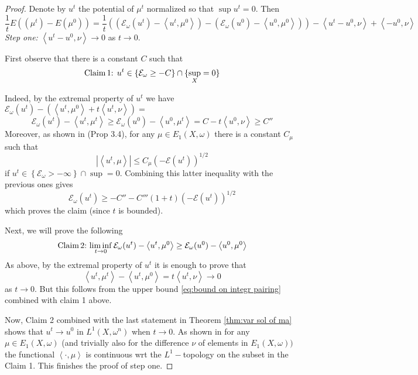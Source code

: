 \documentclass[11pt,oneside,english]{amsart}
\numberwithin{equation}{section}
\numberwithin{figure}{section}
\theoremstyle{plain}
\theoremstyle{plain}
\theoremstyle{plain}
\theoremstyle{plain}
\theoremstyle{remark}
\theoremstyle{definition}
\begin{document}
\begin{proof}
Denote by $u^{t}$ the potential of $\mu^{t}$ normalized so that
$\sup u^{t}=0.$ Then 
\begin{equation}
\frac{1}{t}E\left((\mu^{t})-E(\mu^{0})\right)=\frac{1}{t}\left((\mathcal{E}_{\omega}(u^{t})-\left\langle u^{t},\mu^{0}\right\rangle )-(\mathcal{E}_{\omega}(u^{0})-\left\langle u^{0},\mu^{0}\right\rangle )\right)-\left\langle u^{t}-u^{0},\nu\right\rangle +\left\langle -u^{0},\nu\right\rangle \label{eq:beginning pf of deriv of E}
\end{equation}
 \emph{Step one:} $\left\langle u^{t}-u^{0},\nu\right\rangle \rightarrow0$
as $t\rightarrow0.$

First observe that there is a constant $C$ such that 
\[
\mbox{Claim\,1: }u^{t}\in\left\{ \mathcal{E}_{\omega}\geq-C\right\} \cap\{\sup_{X}=0\}
\]

Indeed, by the extremal property of $u^{t}$ we have $\mathcal{E}_{\omega}(u^{t})-(\left\langle u^{t},\mu^{0}\right\rangle +t\left\langle u^{t},\nu\right\rangle )=$
\[
\mathcal{E}_{\omega}(u^{t})-\left\langle u^{t},\mu^{t}\right\rangle \geq\mathcal{E}_{\omega}(u^{0})-\left\langle u^{0},\mu^{t}\right\rangle =C-t\left\langle u^{0},\nu\right\rangle \geq C''
\]
 Moreover, as shown in \cite{bbgz} (Prop 3.4), for any $\mu\in E_{1}(X,\omega)$
there is a constant $C_{\mu}$ such that 
\begin{equation}
|\left\langle u^{t},\mu\right\rangle |\leq C_{\mu}(-\mathcal{E}(u^{t}))^{1/2}\label{eq:bound on integr pairing}
\end{equation}
 if $u^{t}\in\left\{ \mathcal{E}_{\omega}>-\infty\right\} \cap\sup=0.$
Combining this latter inequality with the previous ones gives 
\[
\mathcal{E}_{\omega}(u^{t})\geq-C''-C'''(1+t)(-\mathcal{E}(u^{t}))^{1/2}
\]
 which proves the claim (since $t$ is bounded).

Next, we will prove the following 
\[
\mbox{Claim\,2:\,}\liminf_{t\rightarrow0}\mathcal{E}_{\omega}(u^{t})-\left\langle u^{t},\mu^{0}\right\rangle \geq\mathcal{E}_{\omega}(u^{0})-\left\langle u^{0},\mu^{0}\right\rangle 
\]
 As above, by the extremal property of $u^{t}$ it is enough to prove
that 
\[
\left\langle u^{t},\mu^{t}\right\rangle -\left\langle u^{t},\mu^{0}\right\rangle =t\left\langle u^{t},\nu\right\rangle \rightarrow0
\]
 as $t\rightarrow0.$ But this follows from the upper bound \ref{eq:bound on integr pairing}
combined with claim 1 above.

Now, Claim 2 combined with the last statement in Theorem \ref{thm:var sol of ma}
shows that $u^{t}\rightarrow u^{0}$ in $L^{1}(X,\omega^{n})$ when
$t\rightarrow0.$ As shown in \cite{bbgz} for any $\mu\in E_{1}(X,\omega)$
(and trivially also for the difference $\nu$ of elements in $E_{1}(X,\omega))$
the functional $\left\langle \cdot,\mu\right\rangle $ is continuous
wrt the $L^{1}-$topology on the subset in the Claim 1. This finishes
the proof of step one.


\end{proof}
\end{document}
